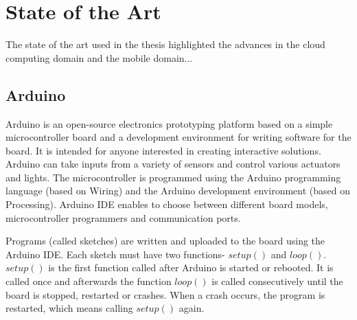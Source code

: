 

\chapter{State of the Art} %

The state of the art used in the thesis highlighted the advances in the cloud computing domain and the mobile domain...


\ifpdf
    \graphicspath{{X/figures/PNG/}{X/figures/PDF/}{X/figures/}}
\else
    \graphicspath{{X/figures/EPS/}{X/figures/}}
\fi


\section{Arduino}


Arduino \cite{arduinoHome} is an open-source electronics prototyping platform based on a simple microcontroller board and a development environment for writing software for the board. It is intended for anyone interested in creating interactive solutions. Arduino can take inputs from a variety of sensors and control various actuators and lights. The microcontroller is programmed using the Arduino programming language (based on Wiring) and the Arduino development environment (based on Processing). Arduino IDE enables to choose between different board models, microcontroller programmers and communication ports. 

Programs (called sketches) are written and uploaded to the board using the Arduino IDE. Each sketch must have two functions- $setup()$ and $loop()$. $setup()$ is the first function called after Arduino is started or rebooted. It is called once and afterwards the function $loop()$ is called consecutively until the board is stopped, restarted or crashes. When a crash occurs, the program is restarted, which means calling $setup()$ again. 

